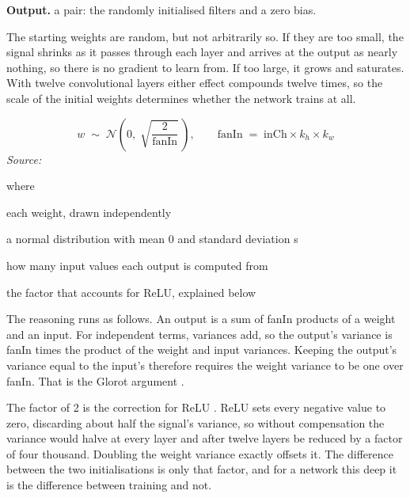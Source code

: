 \noindent\textbf{Output.} a pair: the randomly initialised filters and a zero bias.


The starting weights are random, but not arbitrarily so. If they are too small, the signal shrinks as it passes through each layer and arrives at the output as nearly nothing, so there is no gradient to learn from. If too large, it grows and saturates. With twelve convolutional layers either effect compounds twelve times, so the scale of the initial weights determines whether the network trains at all.



\begin{equation}
w \;\sim\; \mathcal{N}\!\left(0,\; \sqrt{\frac{2}{\mathrm{fanIn}}}\,\right), \qquad \mathrm{fanIn} \;=\; \mathrm{inCh} \times k_h \times k_w
\end{equation}
\noindent\emph{Source: }\cite{he2015}


\noindent where
\begin{description}[leftmargin=2.4em,style=nextline,font=\normalfont\ttfamily]\setlength\itemsep{1pt}
  \item[{$w$}] \normalfont each weight, drawn independently
  \item[{$\mathcal{N}(0,s)$}] \normalfont a normal distribution with mean 0 and standard deviation s
  \item[{$\mathrm{fanIn}$}] \normalfont how many input values each output is computed from
  \item[{$2$}] \normalfont the factor that accounts for ReLU, explained below
\end{description}
The reasoning runs as follows. An output is a sum of fanIn products of a weight and an input. For independent terms, variances add, so the output's variance is fanIn times the product of the weight and input variances. Keeping the output's variance equal to the input's therefore requires the weight variance to be one over fanIn. That is the Glorot argument \cite{glorot2010}.

The factor of 2 is the correction for ReLU \cite{he2015}. ReLU sets every negative value to zero, discarding about half the signal's variance, so without compensation the variance would halve at every layer and after twelve layers be reduced by a factor of four thousand. Doubling the weight variance exactly offsets it. The difference between the two initialisations is only that factor, and for a network this deep it is the difference between training and not.


